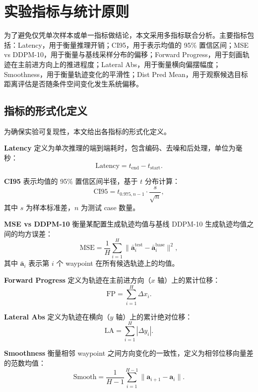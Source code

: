 \section{实验指标与统计原则}

为了避免仅凭单次样本或单一指标做结论，本文采用多指标联合分析。主要指标包括：Latency，用于衡量推理开销；CI95，用于表示均值的 95\% 置信区间；MSE vs DDPM-10，用于衡量与基线采样分布的偏移；Forward Progress，用于刻画轨迹在主前进方向上的推进程度；Lateral Abs，用于衡量横向偏摆幅度；Smoothness，用于衡量轨迹变化的平滑性；Dist Pred Mean，用于观察候选目标距离评估是否随条件空间变化发生系统偏移。

\subsection{指标的形式化定义}

为确保实验可复现性，本文给出各指标的形式化定义。

\textbf{Latency} 定义为单次推理的端到端耗时，包含编码、去噪和后处理，单位为毫秒：
\begin{equation}
\text{Latency} = t_{\text{end}} - t_{\text{start}}.
\end{equation}

\textbf{CI95} 表示均值的 95\% 置信区间半径，基于 $t$ 分布计算：
\begin{equation}
\text{CI95} = t_{0.975, n-1} \cdot \frac{s}{\sqrt{n}},
\end{equation}
其中 $s$ 为样本标准差，$n$ 为测试 case 数量。

\textbf{MSE vs DDPM-10} 衡量某配置生成轨迹均值与基线 DDPM-10 生成轨迹均值之间的均方误差：
\begin{equation}
\text{MSE} = \frac{1}{H} \sum_{i=1}^{H} \|\bar{\mathbf{a}}_i^{\text{test}} - \bar{\mathbf{a}}_i^{\text{base}}\|^2,
\end{equation}
其中 $\bar{\mathbf{a}}_i$ 表示第 $i$ 个 waypoint 在所有候选轨迹上的均值。

\textbf{Forward Progress} 定义为轨迹在主前进方向（$x$ 轴）上的累计位移：
\begin{equation}
\text{FP} = \sum_{i=1}^{H} \Delta x_i.
\end{equation}

\textbf{Lateral Abs} 定义为轨迹在横向（$y$ 轴）上的累计绝对位移：
\begin{equation}
\text{LA} = \sum_{i=1}^{H} |\Delta y_i|.
\end{equation}

\textbf{Smoothness} 衡量相邻 waypoint 之间方向变化的一致性，定义为相邻位移向量差的范数均值：
\begin{equation}
\text{Smooth} = \frac{1}{H-1} \sum_{i=1}^{H-1} \|\mathbf{a}_{i+1} - \mathbf{a}_i\|.
\end{equation}


